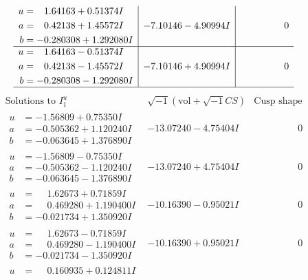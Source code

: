 \documentclass[1p]{elsarticle_modified}
\theoremstyle{definition}
\newcommand{\I}{\sqrt{-1}}
\begin{document}
$$\begin{array}{c|c|c}
\begin{aligned}
u &= \phantom{-}1.64163 + 0.51374 I \\
a &= \phantom{-}0.42138 + 1.45572 I \\
b &= -0.280308 + 1.292080 I\end{aligned}
 & -7.10146 - 4.90994 I & \phantom{-0.000000 } 0 \\ \hline\begin{aligned}
u &= \phantom{-}1.64163 - 0.51374 I \\
a &= \phantom{-}0.42138 - 1.45572 I \\
b &= -0.280308 - 1.292080 I\end{aligned}
 & -7.10146 + 4.90994 I & \phantom{-0.000000 } 0\\
 \hline 
 \end{array}$$\newpage$$\begin{array}{c|c|c}  
\text{Solutions to }I^u_{1}& \I (\text{vol} + \sqrt{-1}CS) & \text{Cusp shape}\\
 \hline 
\begin{aligned}
u &= -1.56809 + 0.75350 I \\
a &= -0.505362 + 1.120240 I \\
b &= -0.063645 + 1.376890 I\end{aligned}
 & -13.07240 - 4.75404 I & \phantom{-0.000000 } 0 \\ \hline\begin{aligned}
u &= -1.56809 - 0.75350 I \\
a &= -0.505362 - 1.120240 I \\
b &= -0.063645 - 1.376890 I\end{aligned}
 & -13.07240 + 4.75404 I & \phantom{-0.000000 } 0 \\ \hline\begin{aligned}
u &= \phantom{-}1.62673 + 0.71859 I \\
a &= \phantom{-}0.469280 + 1.190400 I \\
b &= -0.021734 + 1.350920 I\end{aligned}
 & -10.16390 - 0.95021 I & \phantom{-0.000000 } 0 \\ \hline\begin{aligned}
u &= \phantom{-}1.62673 - 0.71859 I \\
a &= \phantom{-}0.469280 - 1.190400 I \\
b &= -0.021734 - 1.350920 I\end{aligned}
 & -10.16390 + 0.95021 I & \phantom{-0.000000 } 0 \\ \hline\begin{aligned}
u &= \phantom{-}0.160935 + 0.124811 I \\

\end{aligned}
\end{array}$$
\end{document}
